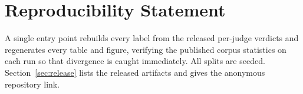 \documentclass{article}
\begin{document}


\section*{Reproducibility Statement}

A single entry point rebuilds every label from the released per-judge
verdicts and regenerates every table and figure, verifying the published
corpus statistics on each run so that divergence is caught immediately. All
splits are seeded. Section~\ref{sec:release} lists the released artifacts and
gives the anonymous repository link.

{\setlength{\bibsep}{3pt plus 0.3ex}\small
}



\end{document}
